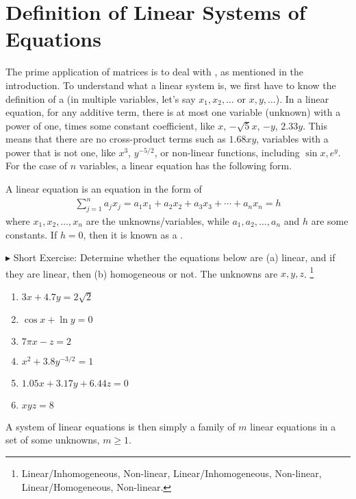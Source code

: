 \section{Definition of Linear Systems of Equations}
\label{section:deflinsys}
The prime application of matrices is to deal with , as mentioned in the introduction. To understand what a linear system is, we first have to know the definition of a  (in multiple variables, let's say $x_1, x_2, \ldots$ or $x, y, \ldots$). In a linear equation, for any additive term, there is at most one variable (unknown) with a power of one, times some constant coefficient, like $x$, $-\sqrt{5}x$, $-y$, $2.33y$. This means that there are no cross-product terms such as $1.68xy$, variables with a power that is not one, like $x^3$, $y^{-5/2}$, or non-linear functions, including $\sin{x}, e^{y}$. For the case of $n$ variables, a linear equation has the following form.
\begin{defn}
A linear equation is an equation in the form of
\begin{align}
\sum_{j=1}^n a_jx_j = a_1x_1 + a_2x_2 + a_3x_3 + \cdots + a_nx_n = h
\end{align}
where $x_1, x_2, \ldots, x_n$ are the unknowns/variables, while $a_1, a_2, \ldots, a_n$ and $h$ are some constants. If $h = 0$, then it is known as a .
\end{defn}
$\blacktriangleright$ Short Exercise: Determine whether the equations below are (a) linear, and if they are linear, then (b) homogeneous or not. The unknowns are $x, y, z$. \footnote{Linear/Inhomogeneous, Non-linear, Linear/Inhomogeneous, Non-linear, Linear/Homogeneous, Non-linear.}
\begin{enumerate}
    \item $3x + 4.7y = 2\sqrt{2}$ 
    \item $\cos x + \ln y = 0$
    \item $7\pi x - z = 2$ 
    \item $x^2 + 3.8y^{-3/2} = 1$
    \item $1.05x + 3.17y + 6.44z = 0$
    \item $xyz = 8$ 
\end{enumerate}
A system of linear equations is then simply a family of $m$ linear equations in a set of some unknowns, $m \geq 1$.
